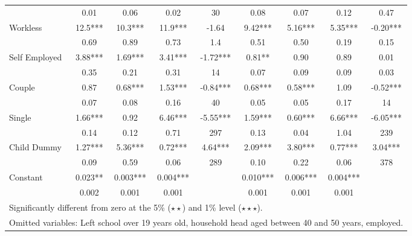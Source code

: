 \begin{table}
\begin{tabular}{l|cccc|cccc}
                    	&	       0.01   	&	0.06	&	0.02	&	30	&	    
				   0.08  	&	0.07	&	0.12	&	0.47	\\
Workless	&	       12.5***	&	       10.3***	&	       11.9***	&	-1.64	&	       									9.42***	&	      5.16***	&	       5.35***	&	-0.20***	\\
	&	       0.69   	&	0.89	&	0.73	&	1.4	&	
		       0.51   	&	0.50	&	0.19	&	0.15	\\
Self Employed	&	       3.88***	&	      1.69***	&	       3.41***	&	-1.72***	&	       							0.81**	&	       0.90 &	       0.89	&	0.01	\\
	&	       0.35   	&	0.21	&	0.31	&	14	&	
		       0.07   	&	0.09	&	0.09	&	0.03	\\
Couple	&	       0.87	&	      0.68***	&	       1.53***	&	-0.84***	&	       							0.68***	&	       0.58*** &	       1.09	&	-0.52***	\\
	&	       0.07  	&	0.08	&	0.16	&	40	&	
		       0.05   	&	0.05	&	0.17	&	14	\\
Single	&	       1.66***	&	      0.92	&	       6.46***	&	-5.55***	&	       							1.59***	&	       0.60***&	      6.66*** &	-6.05***	\\
	&	       0.14   	&	0.12	&	0.71	&	297	&	
		       0.13   	&	0.04	&	1.04	&	239	\\
Child Dummy	&	       1.27***	&	      5.36***	&	      0.72***	&	4.64***	&	       							2.09***	&	       3.80*** &	       0.77***	&	3.04***	\\
	&	       0.09   	&	0.59	&	0.06	&	289	&	
		       0.10   	&	0.22	&	0.06	&	378	\\
Constant            	&	       0.023**	&	       0.003***	&	0.004***	&		&	
				       0.010***	&	       0.006***	&	       0.004***	&		\\
                    	&	       0.002   	&	0.001	&	       0.001 	&		&	 
			      0.001   	&	0.001	&	0.001	&		\\
\hline\hline
\multicolumn{9}{l}{Significantly different from zero at the 5\% ($\star\star$) and 1\% level ($\star\star\star$).} \\
\multicolumn{9}{l}{Omitted variables: Left school over 19 years old, household head aged between 40 and 50 years, employed. } 
\end{tabular}
\label{table:ahc_bhc}
\end{table}



